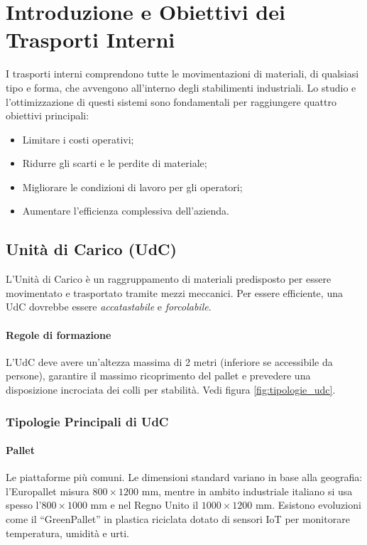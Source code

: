 %
%
\section{Introduzione e Obiettivi dei Trasporti Interni}
I trasporti interni comprendono tutte le movimentazioni di materiali, di qualsiasi tipo e forma, che avvengono all'interno degli stabilimenti industriali. Lo studio e l'ottimizzazione di questi sistemi sono fondamentali per raggiungere quattro obiettivi principali:
\begin{itemize}
    \item Limitare i costi operativi;
    \item Ridurre gli scarti e le perdite di materiale;
    \item Migliorare le condizioni di lavoro per gli operatori;
    \item Aumentare l'efficienza complessiva dell'azienda.
\end{itemize}
%
\subsection{Unità di Carico (UdC)}
L'Unità di Carico è un raggruppamento di materiali predisposto per essere movimentato e trasportato tramite mezzi meccanici. Per essere efficiente, una UdC dovrebbe essere \emph{accatastabile} e \emph{forcolabile}.
%
\paragraph{Regole di formazione} L'UdC deve avere un'altezza massima di 2 metri (inferiore se accessibile da persone), garantire il massimo ricoprimento del pallet e prevedere una disposizione incrociata dei colli per stabilità. Vedi figura \ref{fig:tipologie_udc}.
\subsubsection{Tipologie Principali di UdC}
%
\paragraph{Pallet} Le piattaforme più comuni. Le dimensioni standard variano in base alla geografia: l'Europallet misura $ 800 \times 1200 $ mm, mentre in ambito industriale italiano si usa spesso l'$ 800 \times 1000 $ mm e nel Regno Unito il $ 1000 \times 1200 $ mm. Esistono evoluzioni come il ``GreenPallet'' in plastica riciclata dotato di sensori IoT per monitorare temperatura, umidità e urti.
%
